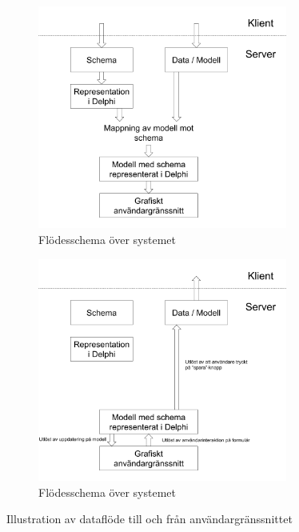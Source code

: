 \begin{figure}
	\begin{subfigure}[b]{0.5\textwidth}
		\includegraphics[width=0.9\textwidth,left]{./images/system-ner.png}
		\caption{Flödesschema över systemet}
		\label{fig:system:ner}
	\end{subfigure}
	\begin{subfigure}[b]{0.5\textwidth}
		\includegraphics[width=0.9\textwidth,right]{./images/system-upp.png}
		\caption{Flödesschema över systemet}
		\label{fig:system:upp}	
	\end{subfigure}
	\caption{Illustration av dataflöde till och från användargränssnittet}
	\label{fig:system}
\end{figure}

